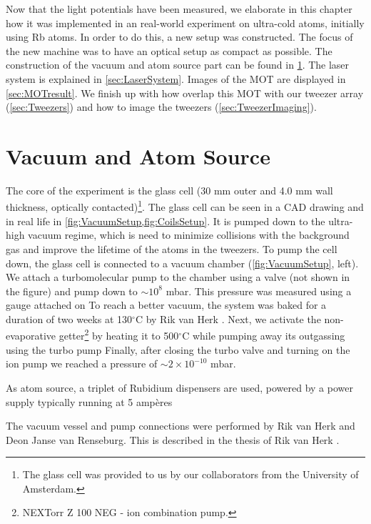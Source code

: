 Now that the light potentials have been measured, we elaborate in this chapter how it was implemented in an real-world experiment on ultra-cold atoms, initially using Rb atoms.
In order to do this, a new setup was constructed.
The focus of the new machine was to have an optical setup as compact as possible.
The construction of the vacuum and atom source part can be found in \cref{sec:VacuumAtom}.
The laser system is explained in \cref{sec:LaserSystem}.
Images of the MOT are displayed in \cref{sec:MOTresult}.
We finish up with how overlap this MOT with our tweezer array (\cref{sec:Tweezers}) and how to image the tweezers (\cref{sec:TweezerImaging}).

\section{Vacuum and Atom Source}\label{sec:VacuumAtom}

The core of the experiment is the glass cell (30 mm outer and 4.0 mm wall thickness, optically contacted)\footnote{The glass cell was provided to us by our collaborators from the University of Amsterdam.}.
The glass cell can be seen in a CAD drawing and in real life in \cref{fig:VacuumSetup,fig:CoilsSetup}.
It is pumped down to the ultra-high vacuum regime, which is need to minimize collisions with the background gas and improve the lifetime of the atoms in the tweezers.
To pump the cell down, the glass cell is connected to a vacuum chamber (\cref{fig:VacuumSetup}, left).
We attach a turbomolecular pump to the chamber using a valve (not shown in the figure) and pump down to $\sim 10^{8}$ mbar.
This pressure was measured using a gauge attached on 
To reach a better vacuum, the system was baked for a duration of two weeks at 130${}^{\circ}$C by Rik van Herk \cite{Herk2022}.
Next, we activate the non-evaporative getter\footnote{NEXTorr Z 100 NEG - ion combination pump.} by heating it to 500${}^{\circ}$C while pumping away its outgassing using the turbo pump
Finally, after closing the turbo valve and turning on the ion pump we reached a pressure of $\sim 2\times 10^{-10}$ mbar.


As atom source, a triplet of Rubidium dispensers are used, powered by a power supply typically running at 5 ampères

The vacuum vessel and pump connections were performed by Rik van Herk and Deon Janse van Renseburg.
This is described in the thesis of Rik van Herk \cite{Herk2022}.



